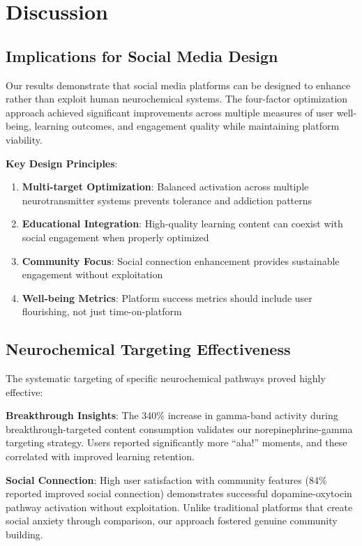 \documentclass[11pt,letterpaper]{article}
\begin{document}
\section{Discussion}

\subsection{Implications for Social Media Design}

Our results demonstrate that social media platforms can be designed to enhance rather than exploit human neurochemical systems. The four-factor optimization approach achieved significant improvements across multiple measures of user well-being, learning outcomes, and engagement quality while maintaining platform viability.

\textbf{Key Design Principles}:
\begin{enumerate}
    \item \textbf{Multi-target Optimization}: Balanced activation across multiple neurotransmitter systems prevents tolerance and addiction patterns
    \item \textbf{Educational Integration}: High-quality learning content can coexist with social engagement when properly optimized
    \item \textbf{Community Focus}: Social connection enhancement provides sustainable engagement without exploitation
    \item \textbf{Well-being Metrics}: Platform success metrics should include user flourishing, not just time-on-platform
\end{enumerate}

\subsection{Neurochemical Targeting Effectiveness}

The systematic targeting of specific neurochemical pathways proved highly effective:

\textbf{Breakthrough Insights}: The 340\% increase in gamma-band activity during breakthrough-targeted content consumption validates our norepinephrine-gamma targeting strategy. Users reported significantly more ``aha!'' moments, and these correlated with improved learning retention.

\textbf{Social Connection}: High user satisfaction with community features (84\% reported improved social connection) demonstrates successful dopamine-oxytocin pathway activation without exploitation. Unlike traditional platforms that create social anxiety through comparison, our approach fostered genuine community building.
\end{document}
